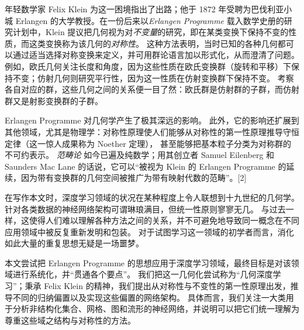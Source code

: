 \documentclass[11pt]{book}              %
\begin{document}
年轻数学家 Felix Klein 为这一困境指出了出路；他于 1872 年受聘为巴伐利亚小城 Erlangen 的大学教授。在一份后来以\emph{Erlangen Programme} 载入数学史册的研究计划中，Klein 提议把几何视为对{\em 不变量}的研究，即在某类变换下保持不变的性质，而这类变换称为该几何的{\em 对称性}。
%
这种方法表明，当时已知的各种几何都可以通过适当选择对称变换来定义，并可用群论语言加以形式化，从而澄清了问题。
%
例如，欧氏几何关注长度和角度，因为这些性质在欧氏变换群（旋转和平移）下保持不变；仿射几何则研究平行性，因为这一性质在仿射变换群下保持不变。
%
考察各自对应的群，这些几何之间的关系便一目了然：欧氏群是仿射群的子群，而仿射群又是射影变换群的子群。


Erlangen Programme 对几何学产生了极其深远的影响。
此外，它的影响还扩展到其他领域，尤其是物理学：对称性原理使人们能够从对称性的第一性原理推导守恒定律（这一惊人成果称为 Noether 定理），
甚至能够把基本粒子分类为对称群的不可约表示。
%
{\em 范畴论}
如今已遍及纯数学；用其创立者 Samuel Eilenberg 和 Saunders Mac Lane 的话说，它可以“被视为 Klein 的 Erlangen Programme 的延续，因为带有变换群的几何空间被推广为带有映射代数的范畴”。[2\baselineskip]




在写作本文时，深度学习领域的状况在某种程度上令人联想到十九世纪的几何学。
针对各类数据的神经网络架构可谓琳琅满目，但统一性原则寥寥无几。
与过去一样，这使得人们难以理解各种方法之间的关系，并不可避免地导致同一概念在不同应用领域中被反复重新发明和包装。
%
对于试图学习这一领域的初学者而言，消化如此大量的重复思想无疑是一场噩梦。


本文尝试把 Erlangen Programme 的思想应用于深度学习领域，最终目标是对该领域进行系统化，并“贯通各个要点”。
%
我们把这一几何化尝试称为“几何深度学习”；秉承 Felix Klein 的精神，我们提出从对称性与不变性的第一性原理出发，推导不同的归纳偏置以及实现这些偏置的网络架构。
%
%
具体而言，我们关注一大类用于分析非结构化集合、网格、图和流形的神经网络，并说明可以把它们统一理解为尊重这些域之结构与对称性的方法。
%
\end{document}
